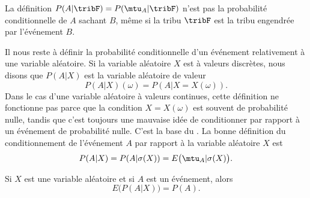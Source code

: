 \begin{remark}
    La définition \(P(A|\tribF)=P(\mtu_A|\tribF)\) n'est pas la probabilité conditionnelle de \( A\) sachant \( B\), même si la tribu \( \tribF\) est la tribu engendrée par l'événement \( B\).
\end{remark}

Il nous reste à définir la probabilité conditionnelle d'un événement relativement à une variable aléatoire. Si la variable aléatoire \( X\) est à valeurs discrètes, nous disons que \( P(A|X)\) est la variable aléatoire de valeur
\begin{equation}
    P(A|X)(\omega)=P(A|X=X(\omega)).
\end{equation}
Dans le cas d'une variable aléatoire à valeurs continues, cette définition ne fonctionne pas parce que la condition \( X=X(\omega)\) est souvent de probabilité nulle, tandis que c'est toujours une mauvaise idée de conditionner par rapport à un événement de probabilité nulle. C'est la base du . La bonne définition du conditionnement de l'événement \( A\) par rapport à la variable aléatoire $X$ est
\begin{equation}
    P(A|X)=P(A|\sigma(X))=E\big( \mtu_A|\sigma(X) \big).
\end{equation}

\begin{proposition}
    Si \( X\) est une variable aléatoire et si \( A\) est un événement, alors
    \begin{equation}
        E\big( P(A|X) \big)=P(A).
    \end{equation}
\end{proposition}

